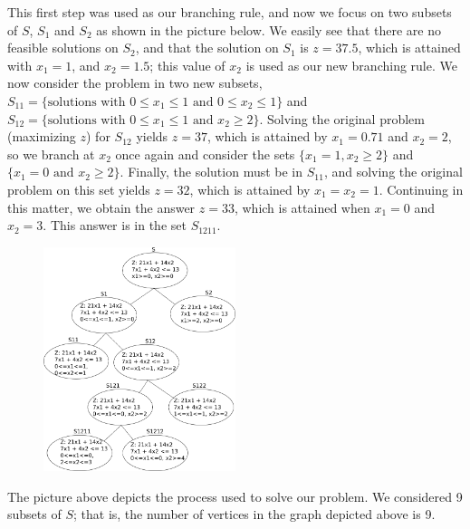 This first step was used as our branching rule, and now we focus on two subsets of $S$, $S_1$ and $S_2$ as shown in the picture below. We easily see that there are no feasible solutions on $S_2$, and that the solution on $S_1$ is $z = 37.5$, which is attained with $x_1 = 1$, and $x_2 = 1.5$; this value of $x_2$ is used as our new branching rule. We now consider the problem in two new subsets, $S_{11} = \{\text{solutions with } 0 \leq x_1 \leq 1 \text{ and } 0\leq x_2 \leq 1\}$ and $S_{12} = \{\text{solutions with }0 \leq x_1 \leq 1 \text{ and } x_2 \geq 2\}$. Solving the original problem (maximizing $z$) for $S_{12}$ yields $z = 37$, which is attained by $x_1 = 0.71$ and $x_2 = 2$, so we branch at $x_2$ once again and consider the sets $\{x_1 = 1, x_2 \geq 2\}$ and $\{x_1 = 0 \text{ and } x_2 \geq 2\}$. Finally, the solution must be in $S_{11}$, and solving the original problem on this set yields $z = 32$, which is attained by $x_1 = x_2 = 1$. Continuing in this matter, we obtain the answer $z = 33$, which is attained when $x_1 = 0$ and $x_2 = 3$. This answer is in the set $S_{1211}$.
	\begin{figure}[H]
	   \centering
	   \includegraphics[width=0.5\textwidth]{season3/304/images/bb.png} 
	\end{figure}
The picture above depicts the process used to solve our problem. We considered 9 subsets of $S$; that is, the number of vertices in the graph depicted above is 9. \\


